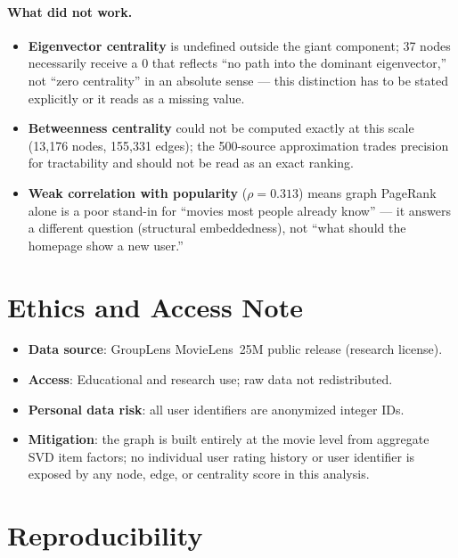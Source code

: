 \documentclass[12pt,a4paper]{article}
\begin{document}
\paragraph{What did not work.}
\begin{itemize}[nosep]
  \item \textbf{Eigenvector centrality} is undefined outside the giant component; 37 nodes
    necessarily receive a 0 that reflects ``no path into the dominant eigenvector,'' not ``zero
    centrality'' in an absolute sense --- this distinction has to be stated explicitly or it reads
    as a missing value.
  \item \textbf{Betweenness centrality} could not be computed exactly at this scale (13,176 nodes,
    155,331 edges); the 500-source approximation trades precision for tractability and should not
    be read as an exact ranking.
  \item \textbf{Weak correlation with popularity} ($\rho=0.313$) means graph PageRank alone is a
    poor stand-in for ``movies most people already know'' --- it answers a different question
    (structural embeddedness), not ``what should the homepage show a new user.''
\end{itemize}

\section{Ethics and Access Note}

\begin{itemize}[nosep]
  \item \textbf{Data source}: GroupLens MovieLens~25M public release (research license).
  \item \textbf{Access}: Educational and research use; raw data not redistributed.
  \item \textbf{Personal data risk}: all user identifiers are anonymized integer IDs.
  \item \textbf{Mitigation}: the graph is built entirely at the movie level from aggregate SVD item
    factors; no individual user rating history or user identifier is exposed by any node, edge, or
    centrality score in this analysis.
\end{itemize}

\section{Reproducibility}
\end{document}
